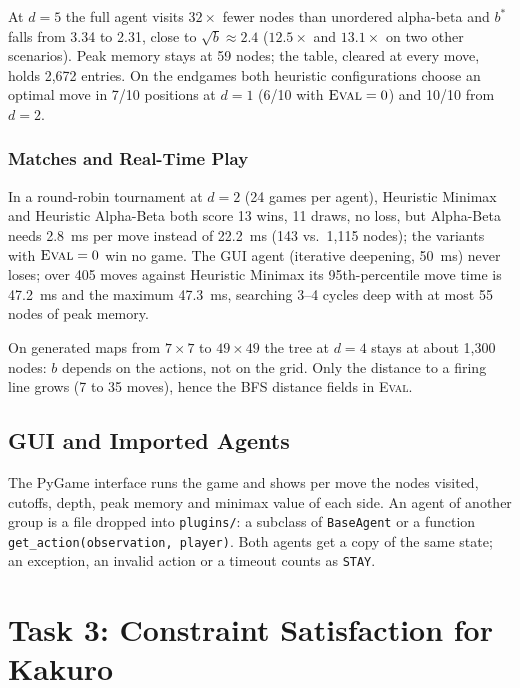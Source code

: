\documentclass[conference]{IEEEtran}
\begin{document}
At $d=5$ the full agent visits $32\times$ fewer nodes than unordered alpha-beta and $b^*$ falls from 3.34 to 2.31, close to $\sqrt{b}\approx 2.4$ ($12.5\times$ and $13.1\times$ on two other scenarios). Peak memory stays at 59 nodes; the table, cleared at every move, holds 2,672 entries. On the endgames both heuristic configurations choose an optimal move in 7/10 positions at $d=1$ (6/10 with $\textsc{Eval}=0$) and 10/10 from $d=2$.

\subsubsection{Matches and Real-Time Play}
In a round-robin tournament at $d=2$ (24 games per agent), Heuristic Minimax and Heuristic Alpha-Beta both score 13 wins, 11 draws, no loss, but Alpha-Beta needs 2.8~ms per move instead of 22.2~ms (143 vs.\ 1,115 nodes); the variants with $\textsc{Eval}=0$ win no game. The GUI agent (iterative deepening, 50~ms) never loses; over 405 moves against Heuristic Minimax its 95th-percentile move time is 47.2~ms and the maximum 47.3~ms, searching 3--4 cycles deep with at most 55 nodes of peak memory.

On generated maps from $7\times 7$ to $49\times 49$ the tree at $d=4$ stays at about 1,300 nodes: $b$ depends on the actions, not on the grid. Only the distance to a firing line grows (7 to 35 moves), hence the BFS distance fields in \textsc{Eval}.

\subsection{GUI and Imported Agents}
The PyGame interface runs the game and shows per move the nodes visited, cutoffs, depth, peak memory and minimax value of each side. An agent of another group is a file dropped into \texttt{plugins/}: a subclass of \texttt{BaseAgent} or a function \texttt{get\_action(observation, player)}. Both agents get a copy of the same state; an exception, an invalid action or a timeout counts as \texttt{STAY}.

\section{Task 3: Constraint Satisfaction for Kakuro}
\end{document}
